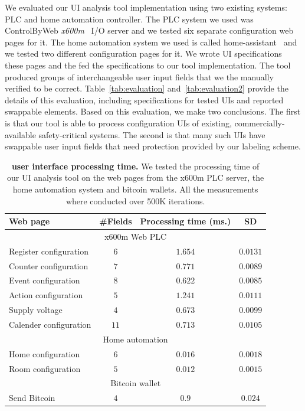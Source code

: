 We evaluated our UI analysis tool implementation using two existing systems: PLC and home automation controller. The PLC system we used was ControlByWeb \emph{x600m}~\cite{controlbyweb} I/O server and we tested six separate configuration web pages for it. The home automation system we used is called home-assistant~\cite{ha} and we tested two different configuration pages for it. We wrote UI specifications these pages and the fed the specifications to our tool implementation. The tool produced groups of interchangeable user input fields that we the manually verified to be correct. Table~\ref{tab:evaluation} and~\ref{tab:evaluation2} provide the details of this evaluation, including specifications for tested UIs and reported swappable elements. Based on this evaluation, we make two conclusions. The first is that our tool is able to process configuration UIs of existing, commercially-available safety-critical systems. The second is that many such UIs have swappable user input fields that need protection provided by our labeling scheme.

\begin{table}[t]
\centering
\small
\caption[\tool user interface processing time]{\textbf{\tool user interface processing time.} We tested the processing time of our UI analysis tool on the web pages from the x600m PLC server, the home automation system and bitcoin wallets. All the measurements where conducted over 500K iterations.}
\begin{tabular}{lccc}
\hline
\textbf{Web page} & \textbf{\#Fields} &\textbf{Processing time (ms.)} & \textbf{SD}\\ \hline
\multicolumn{4}{c}{x600m Web PLC} \\ \hline
Register configuration & $6$ & $1.654$ & $0.0131$\\ 
Counter configuration & $7$ & $0.771$ & $0.0089$\\ 
Event configuration & $8$ & $0.622$ & $0.0085$\\ 
Action configuration & $5$ & $1.241$ & $0.0111$\\ 
Supply voltage & $4$ & $0.673$ & $0.0099$\\ 
Calender configuration & $11$ & $0.713$ & $0.0105$\\ \hline
\multicolumn{4}{c}{Home automation} \\ \hline
Home configuration & $6$ & $0.016$ & $0.0018$\\ 
Room configuration & $5$ & $0.012$ & $0.0015$\\ 
\hline
\multicolumn{4}{c}{Bitcoin wallet} \\ \hline
Send Bitcoin & $4$ & $0.9$ & $0.024$\\ 
\hline
\end{tabular}


\label{tab:frameworkPerformance}
\end{table}


